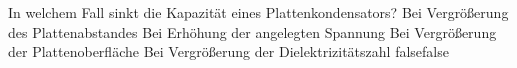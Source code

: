     {In welchem Fall sinkt die Kapazität eines Plattenkondensators?}
    {Bei Vergrößerung des Plattenabstandes}
    {Bei Erhöhung der angelegten Spannung}
    {Bei Vergrößerung der Plattenoberfläche}
    {Bei Vergrößerung der Dielektrizitätszahl}
    {false}{false}